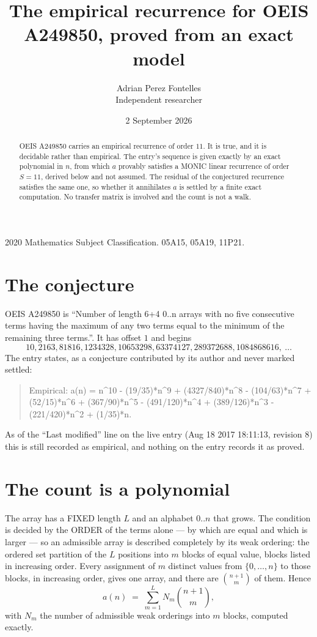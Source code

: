 \documentclass[11pt,a4paper]{article}
\title{The empirical recurrence for OEIS A249850, proved from an exact model}
\author{Adrian Perez Fontelles\\ \small Independent researcher}
\date{2 September 2026}
\theoremstyle{plain}
\theoremstyle{definition}
\begin{document}
\maketitle

\begin{abstract}
OEIS A249850 carries an empirical recurrence of order $11$. It is true, and it is
decidable rather than empirical. The entry's sequence is given exactly by an exact polynomial in $n$, from
which $a$ provably satisfies a MONIC linear recurrence of order $S=11$, derived below and not
assumed. The residual of the conjectured recurrence satisfies the same one, so whether it
annihilates $a$ is settled by a finite exact computation. No transfer matrix is involved and
the count is not a walk.
\end{abstract}

\noindent\small 2020 Mathematics Subject Classification. 05A15, 05A19, 11P21.\normalsize

\section{The conjecture}

OEIS A249850 is ``Number of length 6+4 0..n arrays with no five consecutive terms having the maximum of any two terms equal to the minimum of the remaining three terms.''. It has offset $1$ and begins
\[
10, 2163, 81816, 1234328, 10653298, 63374127, 289372688, 1084868616,\ \dots
\]
The entry states, as a conjecture contributed by its author and never marked settled:
\begin{quote}
Empirical: a(n) = n\^{}10 - (19/35)*n\^{}9 + (4327/840)*n\^{}8 - (104/63)*n\^{}7 + (52/15)*n\^{}6 + (367/90)*n\^{}5 - (491/120)*n\^{}4 + (389/126)*n\^{}3 - (221/420)*n\^{}2 + (1/35)*n.
\end{quote}
As of the ``Last modified'' line on the live entry (Aug 18 2017 18:11:13, revision 8)
this is still recorded as empirical, and nothing on the entry records it as proved.

\section{The count is a polynomial}

The array has a FIXED length $L$ and an alphabet $0..n$ that grows. The condition is decided by
the ORDER of the terms alone --- by which are equal and which is larger --- so an admissible
array is described completely by its weak ordering: the ordered set partition of the $L$
positions into $m$ blocks of equal value, blocks listed in increasing order. Every assignment
of $m$ distinct values from $\{0,\dots,n\}$ to those blocks, in increasing order, gives one
array, and there are $\binom{n+1}{m}$ of them. Hence
\[
a(n)\;=\;\sum_{m=1}^{L} N_m\binom{n+1}{m},
\]
with $N_m$ the number of admissible weak orderings into $m$ blocks, computed exactly.
\end{document}
